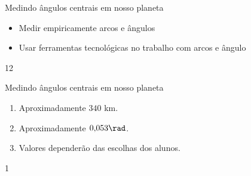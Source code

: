 \clearpage
\def\currentcolor{session2}
\begin{objectives}{Medindo ângulos centrais em nosso planeta}
{
\begin{itemize}
\item Medir empiricamente arcos e ângulos
\item Usar ferramentas tecnológicas no trabalho com arcos e ângulo
\end{itemize}
}{1}{2}
\end{objectives}
\clearmargin
\begin{answer}{Medindo ângulos centrais em nosso planeta}
{
\begin{enumerate}
\item Aproximadamente $340$ km.
\item Aproximadamente $0{,}053\rad$.
\item Valores dependerão das escolhas dos alunos.
\end{enumerate}
}{1}
\end{answer}
\label{trig-prac2}


